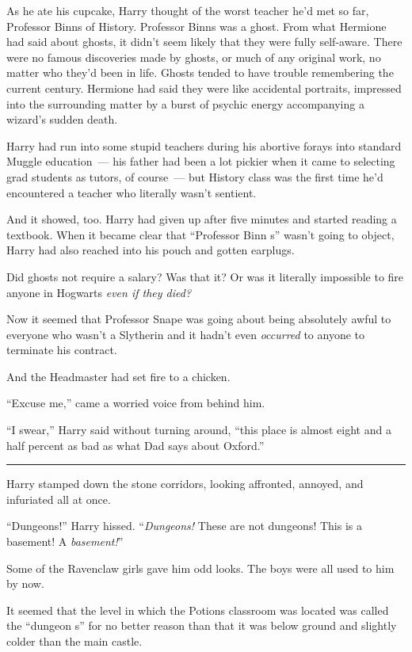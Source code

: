 As he ate his cupcake, Harry thought of the worst teacher he'd met so far, Professor Binns of History. Professor Binns was a ghost. From what Hermione had said about ghosts, it didn't seem likely that they were fully self-aware. There were no famous discoveries made by ghosts, or much of any original work, no matter who they'd been in life. Ghosts tended to have trouble remembering the current century. Hermione had said they were like accidental portraits, impressed into the surrounding matter by a burst of psychic energy accompanying a wizard's sudden death.

Harry had run into some stupid teachers during his abortive forays into standard Muggle education~--- his father had been a lot pickier when it came to selecting grad students as tutors, of course~--- but History class was the first time he'd encountered a teacher who literally wasn't sentient.

And it showed, too. Harry had given up after five minutes and started reading a textbook. When it became clear that ``Professor Binn s'' wasn't going to object, Harry had also reached into his pouch and gotten earplugs.

Did ghosts not require a salary? Was that it? Or was it literally impossible to fire anyone in Hogwarts \emph{even if they died?}

Now it seemed that Professor Snape was going about being absolutely awful to everyone who wasn't a Slytherin and it hadn't even \emph{occurred} to anyone to terminate his contract.

And the Headmaster had set fire to a chicken.

``Excuse me,'' came a worried voice from behind him.

``I swear,'' Harry said without turning around, ``this place is almost eight and a half percent as bad as what Dad says about Oxford.''

\begin{center}\rule{3in}{0.4pt}\end{center}

Harry stamped down the stone corridors, looking affronted, annoyed, and infuriated all at once.

``Dungeons!'' Harry hissed. ``\emph{Dungeons!} These are not dungeons! This is a basement! A \emph{basement!}''

Some of the Ravenclaw girls gave him odd looks. The boys were all used to him by now.

It seemed that the level in which the Potions classroom was located was called the ``dungeon s'' for no better reason than that it was below ground and slightly colder than the main castle.


